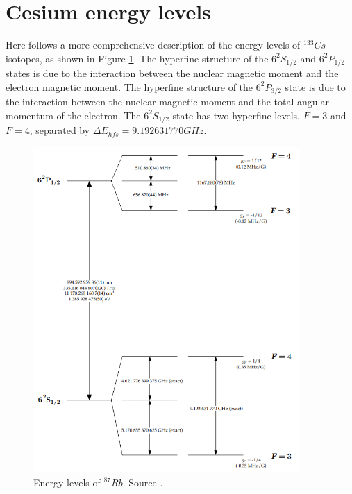 \pagebreak
\section*{Cesium energy levels}
\label{appendix:Cesium-energy-levels}

Here follows a more comprehensive description of the energy levels of $^{133}Cs$ isotopes, as shown in Figure \ref{fig:Cesium-energy-levels}.
The hyperfine structure of the $6^2S_{1/2}$ and $6^2P_{1/2}$ states is due to the interaction between the nuclear magnetic moment and the electron magnetic moment.
The hyperfine structure of the $6^2P_{3/2}$ state is due to the interaction between the nuclear magnetic moment and the total angular momentum of the electron.
The $6^2S_{1/2}$ state has two hyperfine levels, $F=3$ and $F=4$, separated by $\Delta E_{hfs} = 9.192631770 GHz$.

\begin{figure}[H]
    \centering
    \includegraphics[width=0.9\textwidth, max width=\linewidth]{img/levels-Caesium.png}
    \caption{Energy levels of $^{87}Rb$. Source \cite{ALKALINI}.}
    \label{fig:Cesium-energy-levels}
\end{figure}


